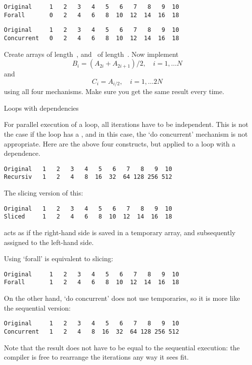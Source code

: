 \begin{verbatim}
Original     1   2   3   4   5   6   7   8   9  10
Forall       0   2   4   6   8  10  12  14  16  18
\end{verbatim}

\begin{verbatim}
Original     1   2   3   4   5   6   7   8   9  10
Concurrent   0   2   4   6   8  10  12  14  16  18
\end{verbatim}

\begin{exercise}
  Create arrays  of length~, and ~of length~.
  Now implement
  \[ B_i = (A_{2i}+A_{2i+1})/2,\quad i=1,\ldots N \]
  and
  \[ C_i = A_{i/2},\quad i=1,\ldots 2N \]
  using all four mechanisms. Make sure you get the same result every time.
\end{exercise}

 {Loops with dependencies}

For parallel execution of a loop, all iterations have to be independent.
This is not the case if the loop has a , and in
this case, the `do concurrent' mechanism is not appropriate.
%
Here are the above four constructs, but applied to a loop with a dependence.
%
%
\begin{verbatim}
Original   1   2   3   4   5   6   7   8   9  10
Recursiv   1   2   4   8  16  32  64 128 256 512
\end{verbatim}

The slicing version of this:
%
%
\begin{verbatim}
Original   1   2   3   4   5   6   7   8   9  10
Sliced     1   2   4   6   8  10  12  14  16  18
\end{verbatim}
%
acts as if the right-hand side is saved in a temporary array, and
subsequently assigned to the left-hand side.

Using `forall' is equivalent to slicing:
%
%
\begin{verbatim}
Original     1   2   3   4   5   6   7   8   9  10
Forall       1   2   4   6   8  10  12  14  16  18
\end{verbatim}

On the other hand, `do concurrent' does not use temporaries, so it is
more like the sequential version:
%
%
\begin{verbatim}
Original     1   2   3   4   5   6   7   8   9  10
Concurrent   1   2   4   8  16  32  64 128 256 512
\end{verbatim}
Note that the result does not have to be equal to the sequential
execution: the compiler is free to rearrange the iterations any way it
sees fit.
